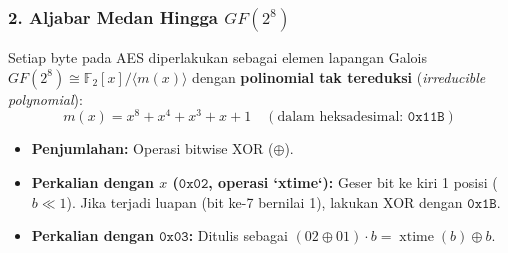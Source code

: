 \documentclass[11pt,a4paper]{article}
\begin{document}
\subsubsection{2. Aljabar Medan Hingga $GF(2^8)$}
Setiap byte pada AES diperlakukan sebagai elemen lapangan Galois $GF(2^8) \cong \mathbb{F}_2[x] / \langle m(x) \rangle$ dengan \textbf{polinomial tak tereduksi} (\textit{irreducible polynomial}):
\[
m(x) = x^8 + x^4 + x^3 + x + 1 \quad (\text{dalam heksadesimal: } \mathtt{0x11B})
\]
\begin{itemize}[leftmargin=*]
    \item \textbf{Penjumlahan:} Operasi bitwise XOR ($\oplus$).
    \item \textbf{Perkalian dengan $x$ ($\mathtt{0x02}$, operasi `xtime`):} Geser bit ke kiri 1 posisi ($b \ll 1$). Jika terjadi luapan (bit ke-7 bernilai 1), lakukan XOR dengan $\mathtt{0x1B}$.
    \item \textbf{Perkalian dengan $\mathtt{0x03}$:} Ditulis sebagai $(02 \oplus 01) \cdot b = \operatorname{xtime}(b) \oplus b$.
\end{itemize}
\end{document}
